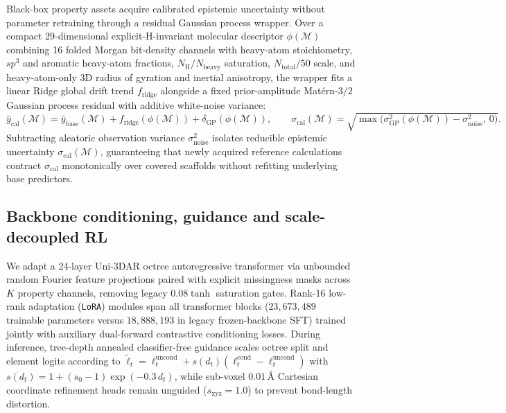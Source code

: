 \documentclass[11pt,a4paper]{article}
\begin{document}
Black-box property assets acquire calibrated epistemic uncertainty without parameter retraining through a residual Gaussian process wrapper. Over a compact 29-dimensional explicit-H-invariant molecular descriptor $\phi(\mathcal{M})$ combining 16 folded Morgan bit-density channels with heavy-atom stoichiometry, $sp^3$ and aromatic heavy-atom fractions, $N_{\text{H}}/N_{\text{heavy}}$ saturation, $N_{\text{total}}/50$ scale, and heavy-atom-only 3D radius of gyration and inertial anisotropy, the wrapper fits a linear Ridge global drift trend $f_{\text{ridge}}$ alongside a fixed prior-amplitude Mat\'ern-$3/2$ Gaussian process residual with additive white-noise variance\cite{rasmussen2006gp}:
\begin{equation}
\hat{y}_{\text{cal}}(\mathcal{M}) = \hat{y}_{\text{base}}(\mathcal{M}) + f_{\text{ridge}}(\phi(\mathcal{M})) + \delta_{\text{GP}}(\phi(\mathcal{M})),
\qquad \sigma_{\text{cal}}(\mathcal{M}) = \sqrt{\max\!\big(\sigma_{\text{GP}}^2(\phi(\mathcal{M})) - \sigma_{\text{noise}}^2,\,0\big)}.
\end{equation}
Subtracting aleatoric observation variance $\sigma_{\text{noise}}^2$ isolates reducible epistemic uncertainty $\sigma_{\text{cal}}(\mathcal{M})$, guaranteeing that newly acquired reference calculations contract $\sigma_{\text{cal}}$ monotonically over covered scaffolds without refitting underlying base predictors.

\subsection*{Backbone conditioning, guidance and scale-decoupled RL}

We adapt a 24-layer Uni-3DAR octree autoregressive transformer\cite{lu2025uni3dar} via unbounded random Fourier feature projections paired with explicit missingness masks across $K$ property channels, removing legacy $0.08\tanh$ saturation gates. Rank-16 low-rank adaptation (\texttt{LoRA}) modules\cite{hu2022lora} span all transformer blocks ($23{,}673{,}489$ trainable parameters versus $18{,}888{,}193$ in legacy frozen-backbone SFT) trained jointly with auxiliary dual-forward contrastive conditioning losses. During inference, tree-depth annealed classifier-free guidance\cite{ho2022cfg} scales octree split and element logits according to $\tilde{\ell}_t = \ell_t^{\text{uncond}} + s(d_t)(\ell_t^{\text{cond}} - \ell_t^{\text{uncond}})$ with $s(d_t) = 1 + (s_0 - 1)\exp(-0.3\, d_t)$, while sub-voxel $0.01\,\text{\AA}$ Cartesian coordinate refinement heads remain unguided ($s_{\text{xyz}}=1.0$) to prevent bond-length distortion.
\end{document}
